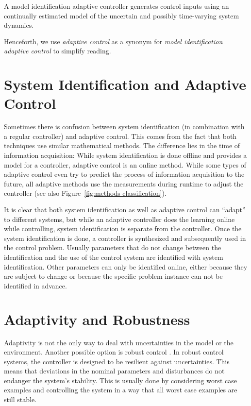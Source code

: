 \begin{definition}
  A model identification adaptive controller generates control inputs using
  an continually estimated model of the uncertain and possibly time-varying
  system dynamics.
\end{definition}

Henceforth, we use \emph{adaptive control} as a synonym for \emph{model
identification adaptive control} to simplify reading.

\pagebreak[4]

\section{System Identification and Adaptive Control}

Sometimes there is confusion between system identification
\cite{Ljung:1999:System} (in combination with a regular controller) and adaptive
control. This comes from the fact that both techniques use similar mathematical
methods. The difference lies in the time of information acquisition: While
system identification is done offline and provides a model for a controller,
adaptive control is an online method. While some types of adaptive control even
try to predict the process of information acquisition to the future, all
adaptive methods use the measurements during runtime to adjust the controller
(see also Figure~\ref{fig:methods-classification}).

It is clear that both system identification as well as adaptive control can
``adapt'' to different systems, but while an adaptive controller does the
learning online while controlling, system identification is separate from the
controller. Once the system identification is done, a controller is synthesized
and subsequently used in the control problem. Usually parameters that do not
change between the identification and the use of the control system are
identified with system identification. Other parameters can only be identified
online, either because they are subject to change or because the specific
problem instance can not be identified in advance.

\section{Adaptivity and Robustness}

Adaptivity is not the only way to deal with uncertainties in the model or the
environment. Another possible option is robust control
\cite{Zhou.Doyle:1998:Essentials}. In robust control systems, the controller is
designed to be resilient against uncertainties. This means that deviations in
the nominal parameters and disturbances do not endanger the system's stability.
This is usually done by considering worst case examples and controlling the
system in a way that all worst case examples are still stable.

